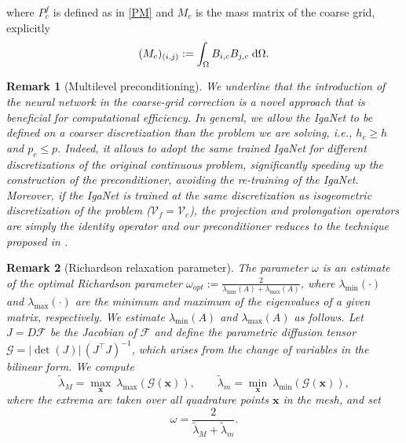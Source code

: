 \documentclass{article}
\theoremstyle{plain}
\newtheorem{rmk}{Remark}
\numberwithin{equation}{section}
\begin{document}
where $P_{c}^f$ is defined as in \eqref{PM} and $M_{c}$ is the mass matrix of the coarse grid, explicitly
\begin{equation*}
    ( M_{c})_{(i,j)} := \int_{\Omega} B_{i,c} B_{j,c}  \hspace{0.1cm} \text{d} \Omega.
\end{equation*}
\begin{rmk}[Multilevel preconditioning]\label{rmk:multilevel_preconditioning}
    We underline that the introduction of the neural network in the coarse-grid correction is a novel approach that is beneficial for computational efficiency.
    In general, we allow the IgaNet to be defined on a coarser discretization than the problem we are solving, i.e., $h_{c} \ge h$ and $p_{c} \le p$.  Indeed, it allows to adopt the same trained IgaNet for different discretizations of the original continuous problem, significantly speeding up the construction of the preconditioner, avoiding the re-training of the IgaNet. Moreover, if the IgaNet is trained at the same discretization as isogeometric discretization of the problem ($\mathcal{V}_{f} = \mathcal{V}_{c}$), the projection and prolongation operators are simply the identity operator and our preconditioner reduces to the technique proposed in \cite{lee2025hybrid}.
\end{rmk}
\begin{rmk}[Richardson relaxation parameter]
    \label{rmk:rich_par}
    The parameter $\omega$ is an estimate of the optimal Richardson parameter $\omega_{opt}:=\frac{2}{\lambda_{\min}(A)+\lambda_{\max}(A)}$, where $\lambda_{\min}(\cdot)$ and $\lambda_{\max}(\cdot)$ are the minimum and maximum of the eigenvalues of a given matrix, respectively.
    We estimate $\lambda_{\min}(A)$ and $\lambda_{\max}(A)$ as follows. Let $J = D\mathcal{F}$ be the Jacobian of $\mathcal{F}$ and define the parametric diffusion tensor $\mathcal{G} = |\det(J)| \, (J^{\top} J)^{-1}$, which arises from the change of variables in the bilinear form. We compute
    \begin{equation*}
        \widetilde{\lambda}_{M} = \max_{\mathbf{x}}\ \lambda_{\max}(\mathcal{G}(\mathbf{x})), \qquad \widetilde{\lambda}_{m} = \min_{\mathbf{x}}\ \lambda_{\min}(\mathcal{G}(\mathbf{x})),
    \end{equation*}
    where the extrema are taken over all quadrature points $\mathbf{x}$ in the mesh, and set
    \begin{equation*}
        \omega = \frac{2}{\widetilde{\lambda}_{M} + \widetilde{\lambda}_{m}}.
    \end{equation*}
\end{rmk}
\end{document}
